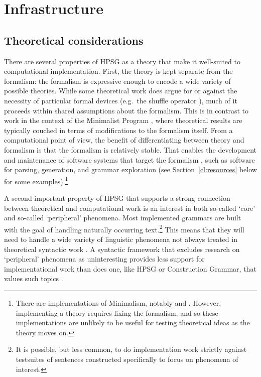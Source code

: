 \documentclass[output=paper,nonflat]{langsci/langscibook}
\begin{document}
\section{Infrastructure}
\label{cl:infrastructure}

\subsection{Theoretical considerations}
\label{cl:theoretical}

There are several properties of HPSG as a theory that make it well-suited to computational implementation.
First, the theory is kept separate from the formalism:
the formalism is expressive enough to encode a wide variety of possible theories.
While some theoretical work does argue for or against the necessity of particular formal devices
(e.g.\ the shuffle operator \citep{Reape94a}),
much of it proceeds within shared assumptions about the formalism.
This is in contrast to work in the context of the Minimalist Program \citep{Chomsky93b-u},
where theoretical results are typically couched in terms of modifications to the formalism itself.
From a computational point of view, the benefit of differentiating between theory and formalism
is that the formalism is relatively stable.
That enables the development and maintenance of software systems that target the formalism \citep{boguraev1988software},
such as software for parsing, generation, and grammar exploration
(see Section~\ref{cl:resources} below for some examples).\footnote{%
	There are implementations of Minimalism, notably \citealt{Stabler97a-u} and \citealt{Herring:16}.
	However, implementing a theory requires fixing the formalism,
	and so these implementations are unlikely to be useful for testing theoretical ideas as the theory moves on.
}

A second important property of HPSG that supports a strong connection between theoretical and computational work is an interest in both so-called `core' and so-called `peripheral' phenomena. Most implemented grammars are built with the goal of handling naturally occurring text.\footnote{It is possible, but less common, to do implementation work strictly against testsuites of sentences constructed specifically to focus on phenomena of interest.} This means that they will need to handle a wide variety of linguistic phenomena not always treated in theoretical syntactic work \citep{Baldwin-et-al-04,Baldwin-et-al-05}. A syntactic framework that excludes research on `peripheral' phenomena as uninteresting provides less support for implementational work than does one, like HPSG or Construction Grammar, that values such topics
.
\end{document}
